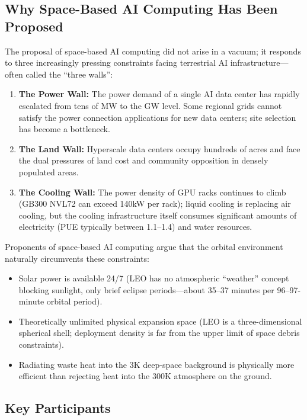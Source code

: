 \subsection{Why Space-Based AI Computing Has Been Proposed}

The proposal of space-based AI computing did not arise in a vacuum; it responds to three increasingly pressing constraints facing terrestrial AI infrastructure---often called the ``three walls'':

\begin{enumerate}[leftmargin=*]
    \item \textbf{The Power Wall:} The power demand of a single AI data center has rapidly escalated from tens of MW to the GW level. Some regional grids cannot satisfy the power connection applications for new data centers; site selection has become a bottleneck.
    \item \textbf{The Land Wall:} Hyperscale data centers occupy hundreds of acres and face the dual pressures of land cost and community opposition in densely populated areas.
    \item \textbf{The Cooling Wall:} The power density of GPU racks continues to climb (GB300 NVL72 can exceed 140\;kW per rack); liquid cooling is replacing air cooling, but the cooling infrastructure itself consumes significant amounts of electricity (PUE typically between 1.1--1.4) and water resources.
\end{enumerate}

Proponents of space-based AI computing argue that the orbital environment naturally circumvents these constraints:
\begin{itemize}[leftmargin=*]
    \item Solar power is available 24/7 (LEO has no atmospheric ``weather'' concept blocking sunlight, only brief eclipse periods---about 35--37 minutes per 96--97-minute orbital period).
    \item Theoretically unlimited physical expansion space (LEO is a three-dimensional spherical shell; deployment density is far from the upper limit of space debris constraints).
    \item Radiating waste heat into the 3\;K deep-space background is physically more efficient than rejecting heat into the 300\;K atmosphere on the ground.
\end{itemize}

\subsection{Key Participants}


